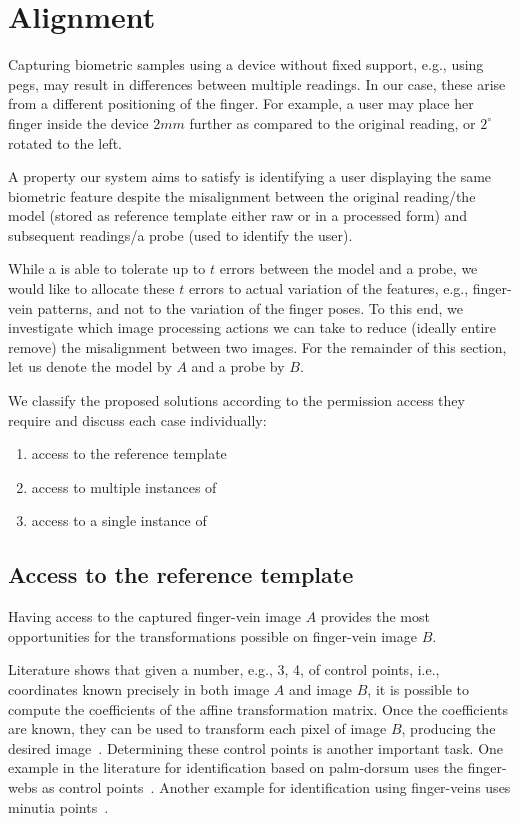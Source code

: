 \section{Alignment}\label{sec:alignment}

Capturing biometric samples using a device without fixed support, e.g., using pegs, may result in differences between multiple readings. In our case, these arise from a different positioning of the finger. For example, a user may place her finger inside the device $2mm$ further as compared to the original reading, or $2^\circ$ rotated to the left.

A property our system aims to satisfy is identifying a user displaying the same biometric feature despite the misalignment between the original reading/the model (stored as reference template either raw or in a processed form) and subsequent readings/a probe (used to identify the user). 

While a \fe is able to tolerate up to $t$ errors between the model and a probe, we would like to allocate these $t$ errors to actual variation of the features, e.g., finger-vein patterns, and not to the variation of the finger poses.
To this end, we investigate which image processing actions we can take to reduce (ideally entire remove) the misalignment between two images.
For the remainder of this section, let us denote the model by $A$ and a probe by $B$. 

We classify the proposed solutions according to the permission access they require and discuss each case individually:
\begin{enumerate}
    \item access to the reference template
    \item access to multiple instances of \rep
    \item access to a single instance of \rep 
\end{enumerate}



\subsection{Access to the reference template}
Having access to the captured finger-vein image $A$ provides the most opportunities for the transformations possible on finger-vein image $B$.


Literature shows that given a number, e.g., 3, 4, of control points, i.e., coordinates known precisely in both image $A$ and image $B$, it is possible to compute the coefficients of the affine transformation matrix. Once the coefficients are known, they can be used to transform each pixel of image $B$, producing the desired image~\cite{imgproc}. Determining these control points is another important task. One example in the literature for identification based on palm-dorsum uses the finger-webs as control points~\cite{palm}. Another example for identification using finger-veins uses minutia points~\cite{minutia}.

